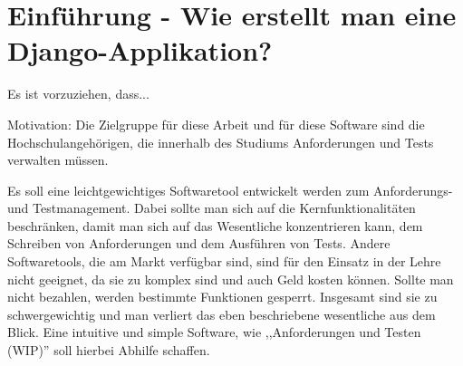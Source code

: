 \documentclass[11pt,a4paper]{report}
\begin{document}

\begin{abstract} 
\LaTeX\ bietet Buchdruckqualität für jedermann.
Wir zeigen anhand dieses durch persönliche Präferenzen geprägtes Template, 
wie man Buchdruckqualität für eine Abschlussarbeit einfach erreichen kann.
Dazu werden beispielhaft Lösungen zu üblichen Fragestellungen im Dokument 
vorgestellt.
Zunächst benötigt man ein passendes \LaTeX\ System mit einigen 
installierten Erweiterungspaketen, das es erlaubt das Template zu 
übersetzen. 
Neben den grundlegenden For\-ma\-tie\-rungs\-möglich\-keiten mit \LaTeX\ wird 
insbesondere das Erstellen und Einbinden von Grafiken, Listings und 
mathematischen Formeln gezeigt.
Des Weiteren werden Literatur- und andere Verzeichnisse eingebunden.
Nicht zuletzt finden sich auch sachdienliche Hinweise zum
Schreiben und Zitieren von Literatur.
\end{abstract}

\tableofcontents %

\chapter{Einführung - Wie erstellt man eine Django-Applikation?} \label{chap:einf}


Es ist vorzuziehen, dass...

Motivation:
Die Zielgruppe für diese Arbeit und für diese Software sind die Hochschulangehörigen, die innerhalb des Studiums Anforderungen und Tests verwalten müssen. 

Es soll eine leichtgewichtiges Softwaretool entwickelt werden zum Anforderungs- und Testmanagement. Dabei sollte man sich auf die Kernfunktionalitäten beschränken, damit man sich auf das Wesentliche konzentrieren kann, dem Schreiben von Anforderungen und dem Ausführen von Tests. Andere Softwaretools, die am Markt verfügbar sind, sind für den Einsatz in der Lehre nicht geeignet, da sie zu komplex sind und auch Geld kosten können. Sollte man nicht bezahlen, werden bestimmte Funktionen gesperrt. Insgesamt sind sie zu schwergewichtig und man verliert das eben beschriebene wesentliche aus dem Blick. Eine intuitive und simple Software, wie ,,Anforderungen und Testen (WIP)'' soll hierbei Abhilfe schaffen.
\end{document}
